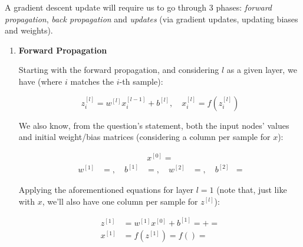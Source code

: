\documentclass[12pt]{article}
\begin{document}
\begin{enumerate}[leftmargin=\labelsep]
        A gradient descent update will require us to go through 3 phases: \emph{forward
          propagation}, \emph{back propagation} and \emph{updates} (via gradient updates, updating
        biases and weights).

        \begin{enumerate}
          \item \textbf{Forward Propagation}

                Starting with the forward propagation, and considering $l$ as a given layer,
                we have (where $i$ matches the $i$-th sample):

                \begin{equation*}
                  z_i^{[l]} = w^{[l]} x_i^{[l-1]} + b^{[l]}, \quad x_i^{[l]} = f\left(z_i^{[l]}\right)
                \end{equation*}

                We also know, from the question's statement, both the input nodes' values
                and initial weight/bias matrices (considering a column per sample for $x$):

                \begin{equation*}
                  \begin{aligned}
                    x^{[0]} = 
                  \end{aligned}
                \end{equation*}
                \begin{equation*}
                  \begin{aligned}
                    w^{[1]} & = , \quad
                    b^{[1]} & = , \quad
                    w^{[2]} & = , \quad
                    b^{[2]} & = 
                  \end{aligned}
                \end{equation*}

                Applying the aforementioned equations for layer $l = 1$ (note that, just like with $x$,
                we'll also have one column per sample for $z^{[l]}$):

                \begin{equation*}
                  \begin{aligned}
                    z^{[1]} & = w^{[1]}x^{[0]} + b^{[1]}
                    =   + 
                    =       \\
                    x^{[1]} & = f(z^{[1]})
                    = f\left(\right)
                    = 
                  \end{aligned}
                \end{equation*}


\end{enumerate}
\end{enumerate}
\end{document}
